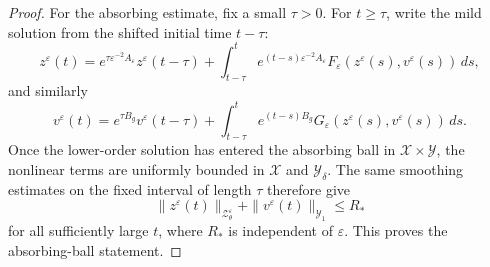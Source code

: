 \documentclass[11pt]{article}
\theoremstyle{definition}
\theoremstyle{remark}
\numberwithin{equation}{section}
\begin{document}
\begin{proof}
For the absorbing estimate, fix a small \(\tau>0\). For \(t\ge\tau\), write the
mild solution from the shifted initial time \(t-\tau\):
\[
z^\varepsilon(t)
=
e^{\tau \varepsilon^{-2}A_\varepsilon}z^\varepsilon(t-\tau)
+
\int_{t-\tau}^t
e^{(t-s)\varepsilon^{-2}A_\varepsilon}
F_\varepsilon(z^\varepsilon(s),v^\varepsilon(s))\,ds,
\]
and similarly
\[
v^\varepsilon(t)
=
e^{\tau B_g}v^\varepsilon(t-\tau)
+
\int_{t-\tau}^t
e^{(t-s)B_g}
G_\varepsilon(z^\varepsilon(s),v^\varepsilon(s))\,ds.
\]
Once the lower-order solution has entered the absorbing ball in
\(\mathcal X\times\mathcal Y\), the nonlinear terms are uniformly bounded in
\(\mathcal X\) and \(\mathcal Y_\delta\). The same smoothing estimates on the
fixed interval of length \(\tau\) therefore give
\[
\|z^\varepsilon(t)\|_{\mathcal Z_\theta^\varepsilon}
+
\|v^\varepsilon(t)\|_{\mathcal Y_1}
\le R_*
\]
for all sufficiently large \(t\), where \(R_*\) is independent of
\(\varepsilon\). This proves the absorbing-ball statement.
\end{proof}
\end{document}
